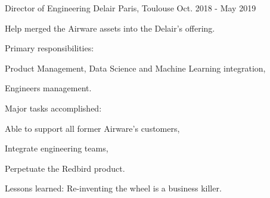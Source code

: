 \begin{cventries}
  \cventry
    {Director of Engineering} %
    {Delair} %
    {Paris, Toulouse} %
    {Oct. 2018 - May 2019} %
    {
      \begin{cvitems} %
        \item {Help merged the Airware assets into the Delair's offering.}
        \item {Primary responsibilities:}
        \begin{cvsubitems}
          \item {Product Management, Data Science and Machine Learning integration,}
          \item {Engineers management.}
        \end{cvsubitems}
        \item {Major tasks accomplished:}
        \begin{cvsubitems}
          \item {Able to support all former Airware's customers,}
          \item {Integrate engineering teams,}
          \item {Perpetuate the Redbird product.}
        \end{cvsubitems}
        \item {Lessons learned: Re-inventing the wheel is a business killer.}
      \end{cvitems}
    }


\end{cventries}
